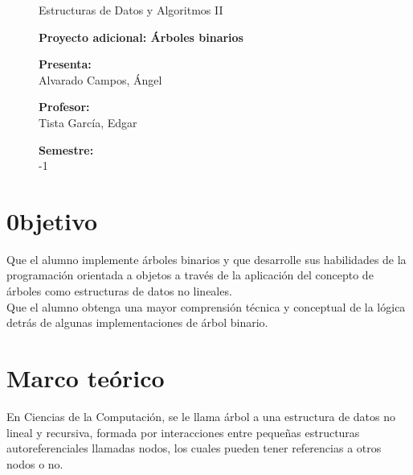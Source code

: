\documentclass[letterpaper, 11pt]{article}
\begin{document}
\begin{figure}[H]
		\vspace{15mm}
		
		\centering
		{\fontsize{18}{18} \selectfont Estructuras de Datos y Algoritmos II}
		
		\vspace{25mm}
		
		{\fontsize{18}{18} \selectfont \textbf{Proyecto adicional: Árboles binarios}}
		
		\vspace{20mm}
		
		{\fontsize{15}{15} \selectfont \textbf{Presenta:}}\\
		{\fontsize{15}{15} \selectfont Alvarado Campos, Ángel}\\
		
		\vspace{25mm}
		
		{\fontsize{15}{15} \selectfont \textbf{Profesor:}}\\
		{\fontsize{15}{15} \selectfont Tista García, Edgar}\\
		
		\vspace{25mm}
		
		{\fontsize{15}{15} \selectfont \textbf{Semestre:}}\\
		{\fontsize{15}{15} -1}\\
	\end{figure} %
	\pagestyle{empty}
	\newpage
	
	\section*{\centering 0bjetivo}
		Que el alumno implemente árboles binarios y que desarrolle sus habilidades de la programación orientada a objetos a través de la aplicación del concepto de árboles como estructuras de datos no lineales. \\
		
		Que el alumno obtenga una mayor comprensión técnica y conceptual de la lógica detrás de algunas implementaciones de árbol binario.
		
	\section*{\centering Marco teórico}
	
	En Ciencias de la Computación, se le llama árbol a una estructura de datos no lineal y recursiva, formada por interacciones entre pequeñas estructuras autoreferenciales llamadas nodos, los cuales pueden tener referencias a otros nodos o no. 
	
\end{document}
